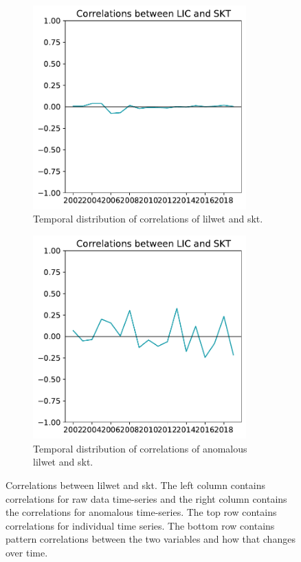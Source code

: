 \documentclass[../main.tex]{subfiles}
\begin{document}
\begin{figure}[ht!]
\begin{subfigure}[ht!]{0.49\textwidth}
\end{subfigure}
\begin{subfigure}[ht!]{0.49\textwidth}
\centering
\includegraphics[width=0.9\textwidth]{images/week8/hres/corr_lic_skt_shortterm_temporal}
\caption{Temporal distribution of correlations of \gls{lilwet}  and \gls{skt}.}
\end{subfigure}
\begin{subfigure}[ht!]{0.49\textwidth}
\centering
\includegraphics[width=0.9\textwidth]{images/week8/hres/corr_lic_skt_shortterm_temporal_anmomalous}
\caption{Temporal distribution of correlations of anomalous \gls{lilwet}  and \gls{skt}.}
\end{subfigure}
\caption{Correlations between \gls{lilwet}  and \gls{skt}. The left column contains correlations for raw data time-series and the right column contains the correlations for anomalous time-series. The top row contains correlations for individual time series. The bottom row contains pattern correlations between the two variables and how that changes over time.}
\label{fig:correlation_between_LIC_and_SKT.}
\end{figure}
\end{document}
